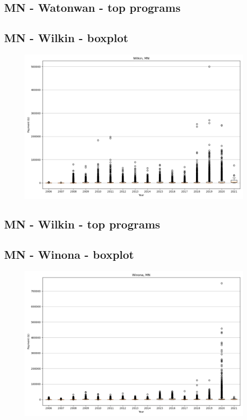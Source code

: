 \subsection*{MN - Watonwan - top programs}

\newpage
\subsection*{MN - Wilkin - boxplot}
\begin{figure}[h]
\centering
\includegraphics[width=7in]{../output/boxplots/counties/Wilkin-MN_boxplot.png}
\end{figure}


\subsection*{MN - Wilkin - top programs}

\newpage
\subsection*{MN - Winona - boxplot}
\begin{figure}[h]
\centering
\includegraphics[width=7in]{../output/boxplots/counties/Winona-MN_boxplot.png}
\end{figure}


